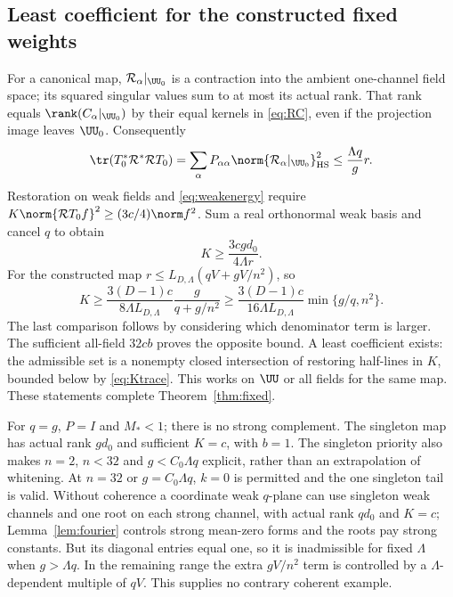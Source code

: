 \subsection{Least coefficient for the constructed fixed weights}
For a canonical map, $\mathcal R_\alpha|_{\UU_0}$ is a contraction into the
ambient one-channel field space; its squared singular values sum to at most
its actual rank. That rank equals $\rank(C_\alpha|_{\UU_0})$ by their equal
kernels in \eqref{eq:RC}, even if the projection image leaves $\UU_0$.
Consequently
\[
 \tr(T_0^*\mathcal R^*\mathcal RT_0)
 =\sum_\alpha P_{\alpha\alpha}
             \norm{\mathcal R_\alpha|_{\UU_0}}_{\rm HS}^2
 \leq\frac{\Lambda q}{g}r.
\]
Restoration on weak fields and \eqref{eq:weakenergy} require
$K\norm{\mathcal RT_0f}^2\geq(3c/4)\norm f^2$.
Sum a real orthonormal weak basis and cancel $q$ to obtain
\begin{equation}\label{eq:Ktrace}
 K\geq\frac{3cgd_0}{4\Lambda r}.
\end{equation}
For the constructed map $r\leq L_{D,\Lambda}(qV+gV/n^2)$, so
\[
 K\geq\frac{3(D-1)c}{8\Lambda L_{D,\Lambda}}
          \frac g{q+g/n^2}
 \geq\frac{3(D-1)c}{16\Lambda L_{D,\Lambda}}\min\{g/q,n^2\}.
\]
The last comparison follows by considering which denominator term is larger.
The sufficient all-field $32cb$ proves the opposite bound. A least coefficient
exists: the admissible set is a nonempty closed intersection of restoring
half-lines in $K$, bounded below by \eqref{eq:Ktrace}. This works on $\UU$
or all fields for the same map. These statements complete
Theorem~\ref{thm:fixed}.

\begin{remark}\label{rem:endpoints}
For $q=g$, $P=I$ and $M_*<1$; there is no strong complement. The singleton
map has actual rank $gd_0$ and sufficient $K=c$, with $b=1$. The singleton
priority also makes $n=2$, $n<32$ and $g<C_0\Lambda q$ explicit, rather than
an extrapolation of whitening. At $n=32$ or $g=C_0\Lambda q$, $k=0$ is
permitted and the one singleton tail is valid.
Without coherence a coordinate weak $q$-plane can use singleton weak channels
and one root on each strong channel, with actual rank $qd_0$ and $K=c$;
Lemma~\ref{lem:fourier} controls strong mean-zero forms and the roots pay
strong constants. But its diagonal entries equal one, so it is inadmissible
for fixed $\Lambda$ when $g>\Lambda q$. In the remaining range the extra
$gV/n^2$ term is controlled by a $\Lambda$-dependent multiple of $qV$.
This supplies no contrary coherent example.
\end{remark}
